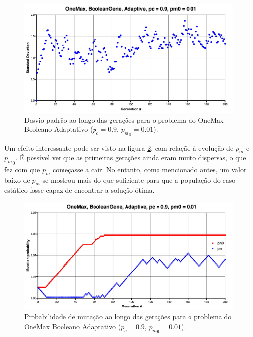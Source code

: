 \begin{figure}[ht!]
    \centering \includegraphics[width=1.0\textwidth]{onemax_boolean_adaptive_std.jpg}
    \caption{Desvio padrão ao longo das gerações para o problema do OneMax Booleano Adaptativo ($p_c=0.9$, ${p_m}_0=0.01$).}
    \label{fig:onemax_boolean_adaptive_std}
\end{figure}

Um efeito interessante pode ser visto na figura \ref{fig:onemax_boolean_adaptive_pm}, com relação à evolução de $p_m$ e ${p_m}_0$. É possível ver que as primeiras gerações ainda eram muito dispersas, o que fez com que $p_m$ começasse a cair. No entanto, como mencionado antes, um valor baixo de $p_m$ se mostrou mais do que suficiente para que a população do caso estático fosse capaz de encontrar a solução ótima.

\begin{figure}[ht!]
    \centering \includegraphics[width=1.0\textwidth]{onemax_boolean_adaptive_pm.jpg}
    \caption{Probabilidade de mutação ao longo das gerações para o problema do OneMax Booleano Adaptativo ($p_c=0.9$, ${p_m}_0=0.01$).}
    \label{fig:onemax_boolean_adaptive_pm}
\end{figure}

